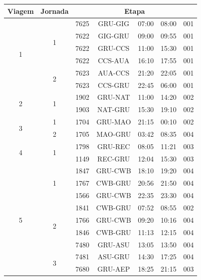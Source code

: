 \begin{table}[!htb]
	\begin{center}
		\begin{tabular}{|c|c|ccccc|}
			\hline
			{\bf Viagem} & {\bf Jornada} & \multicolumn{5}{|c|}{\bf Etapa} \\ \hline \hline
			\multirow{6}{*}{1} & \multirow{4}{*}{1}  
			  & 7625 & GRU-GIG & 07:00 & 08:00 & 001 \\
			& & 7622 & GIG-GRU & 09:00 & 09:55 & 001 \\
			& & 7622 & GRU-CCS & 11:00 & 15:30 & 001 \\
			& & 7622 & CCS-AUA & 16:10 & 17:55 & 001 \\ \cline{2-7}
			                       & \multirow{2}{*}{2}
				& 7623 & AUA-CCS & 21:20 & 22:05 & 001 \\
			& &	7623 & CCS-GRU & 22:45 & 06:00 & 001 \\ \hline \hline
			\multirow{2}{*}{2} & \multirow{2}{*}{1}  		
				& 1902 & GRU-NAT & 11:00 & 14:20 & 002 \\
			& & 1903 & NAT-GRU & 15:30 & 19:10 & 002 \\ \hline \hline
			\multirow{2}{*}{3} & \multirow{1}{*}{1}  		
				& 1704 & GRU-MAO & 21:15 & 00:10 & 002 \\ \cline{2-7}
                           	& \multirow{1}{*}{2}
				&	1705 & MAO-GRU & 03:42 & 08:35 & 004 \\ \hline \hline
			\multirow{2}{*}{4} & \multirow{2}{*}{1}  		
				& 1798 & GRU-REC & 08:05 & 11:21 & 003 \\
			& & 1149 & REC-GRU & 12:04 & 15:30 & 003 \\ \hline \hline			
			\multirow{10}{*}{5} & \multirow{3}{*}{1}  
				&	1847 & GRU-CWB & 18:10 & 19:20 & 004 \\
			& &	1767 & CWB-GRU & 20:56 & 21:50 & 004 \\
			& &	1566 & GRU-CWB & 22:35 & 23:30 & 004 \\ \cline{2-7}
                           		& \multirow{4}{*}{2}
				&	1841 & CWB-GRU & 07:52 & 08:55 & 002 \\
			&	&	1766 & GRU-CWB & 09:20 & 10:16 & 004 \\
			&	&	1846 & CWB-GRU & 11:13 & 12:15 & 004 \\
			&	&	7480 & GRU-ASU & 13:05 & 13:50 & 004 \\ \cline{2-7}
                           		& \multirow{3}{*}{3}
				&	7481 & ASU-GRU & 14:30 & 17:25 & 004 \\
			&	&	7680 & GRU-AEP & 18:25 & 21:15 & 003 \\

\end{tabular}
\end{center}
\end{table}
